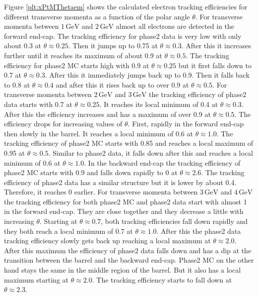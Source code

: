 \documentclass[a4paper,11pt,twosided,final,german,openbib,pdftex,listof=totoc,bibliography=totoc]{scrbook}
\begin{document}
Figure \ref{plt:xPtMThetaem} shows the calculated electron tracking efficiencies for different transverse momenta as a function of the polar angle $\theta$. For transverse momenta between $1\,\textrm{GeV}$ and $2\,\textrm{GeV}$ almost all electrons are detected in the forward end-cap.  The tracking efficiency for phase2 data is very low with only about 0.3 at $\theta \approx 0.25$. Then it jumps up to 0.75 at $\theta \approx 0.3$. After this it increases further until it reaches its maximum of about 0.9 at $\theta \approx 0.5$. The tracking efficiency for phase2 MC starts high with 0.9 at $\theta \approx 0.25$ but it first falls down to 0.7 at $\theta \approx 0.3$. After this it immediately jumps back up to 0.9. Then it falls back to 0.8 at $\theta \approx 0.4$ and after this it rises back up to over 0.9 at $\theta \approx 0.5$.
For transverse momenta between $2\,\textrm{GeV}$ and $3\,\textrm{GeV}$ the tracking efficiency of phase2 data starts with 0.7 at $\theta \approx 0.25$. It reaches its local minimum of 0.4 at $\theta \approx 0.3$. After this the efficiency increases and has a maximum of over 0.9 at $\theta \approx 0.5$. The efficiency drops for increasing values of $\theta$. First, rapidly in the forward end-cap then slowly in the barrel. It reaches a local minimum of 0.6 at $\theta \approx 1.0$. The tracking efficiency of phase2 MC starts with 0.85 and reaches a local maximum of 0.95 at $\theta \approx 0.5$. Similar to phase2 data, it falls down after this and reaches a local minimum of 0.6 at $\theta \approx 1.0$. In the backward end-cap the tracking efficiency of phase2 MC starts with 0.9 and falls down rapidly to 0 at $\theta \approx 2.6$. The tracking efficiency of phase2 data has a similar structure but it is lower by about 0.4. Therefore, it reaches 0 earlier.
For transverse momenta between $3\,\textrm{GeV}$ and $4\,\textrm{GeV}$ the tracking efficiency for both phase2 MC and phase2 data start with almost 1 in the forward end-cap. They are close together and they decrease a little with increasing $\theta$. Starting at $\theta \approx 0.7$, both tracking efficiencies fall down rapidly and they both reach a local minimum of 0.7 at $\theta \approx 1.0$. After this the phase2 data tracking efficiency slowly gets back up reaching a local maximum at $\theta \approx 2.0$. After this maximum the efficiency of phase2 data falls down and has a dip at the transition between the barrel and the backward end-cap. Phase2 MC on the other hand stays the same in the middle region of the barrel. But it also has a local maximum starting at $\theta \approx 2.0$. The tracking efficiency starts to fall down at $\theta \approx 2.3$.
\end{document}
